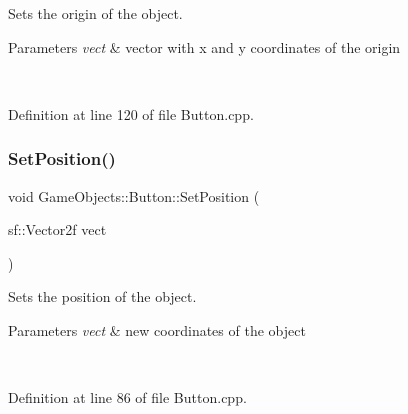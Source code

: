 Sets the origin of the object. 


\begin{DoxyParams}{Parameters}
{\em vect} & vector with x and y coordinates of the origin \begin{DoxyVerb}\end{DoxyVerb}
 \\
\hline
\end{DoxyParams}


Definition at line 120 of file Button.\+cpp.


\begin{DoxyCode}{0}

\end{DoxyCode}
\mbox{\label{class_game_objects_1_1_button_a72088e5bd0e281c879587b24e267f12f}} 
\subsubsection{\texorpdfstring{SetPosition()}{SetPosition()}\hspace{0.1cm}{\footnotesize\ttfamily [1/2]}}
{\footnotesize\ttfamily void Game\+Objects\+::\+Button\+::\+Set\+Position (\begin{DoxyParamCaption}\item[{sf\+::\+Vector2f}]{vect }\end{DoxyParamCaption})}



Sets the position of the object. 


\begin{DoxyParams}{Parameters}
{\em vect} & new coordinates of the object \begin{DoxyVerb}\end{DoxyVerb}
 \\
\hline
\end{DoxyParams}


Definition at line 86 of file Button.\+cpp.


\begin{DoxyCode}{0}

\end{DoxyCode}
\mbox{\label{class_game_objects_1_1_button_acd7702c79e4eb9d340f25db686e67102}} 
